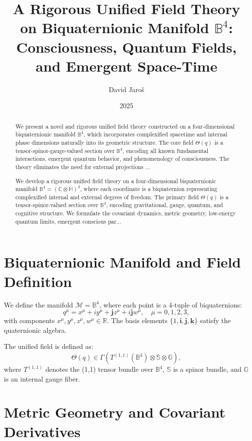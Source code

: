 \documentclass[12pt]{article}
\title{A Rigorous Unified Field Theory on Biquaternionic Manifold \( \mathbb{B}^4 \): Consciousness, Quantum Fields, and Emergent Space-Time}
\author{David Jaroš}
\date{2025}
\begin{document}
\maketitle

\begin{abstract}
We present a novel and rigorous unified field theory constructed on a four-dimensional biquaternionic manifold \( \mathbb{B}^4 \), which incorporates complexified spacetime and internal phase dimensions naturally into its geometric structure. The core field \( \Theta(q) \) is a tensor-spinor-gauge-valued section over \( \mathbb{B}^4 \), encoding all known fundamental interactions, emergent quantum behavior, and phenomenology of consciousness. The theory eliminates the need for external projections ...

We develop a rigorous unified field theory on a four-dimensional biquaternionic manifold \( \mathbb{B}^4 = (\mathbb{C} \otimes \mathbb{H})^4 \), where each coordinate is a biquaternion representing complexified internal and external degrees of freedom. The primary field \( \Theta(q) \) is a tensor-spinor-valued section over \( \mathbb{B}^4 \), encoding gravitational, gauge, quantum, and cognitive structure. We formulate the covariant dynamics, metric geometry, low-energy quantum limits, emergent conscious par...
\end{abstract}

\section{Biquaternionic Manifold and Field Definition}

We define the manifold \( \mathcal{M} = \mathbb{B}^4 \), where each point is a 4-tuple of biquaternions:
\[
q^\mu = x^\mu + i y^\mu + \mathbf{j} z^\mu + i \mathbf{j} w^\mu, \quad \mu = 0,1,2,3,
\]
with components \( x^\mu, y^\mu, z^\mu, w^\mu \in \mathbb{R} \). The basis elements \( \{1, \mathbf{i}, \mathbf{j}, \mathbf{k}\} \) satisfy the quaternionic algebra.

The unified field is defined as:
\[
\Theta(q) \in \Gamma \left( T^{(1,1)}(\mathbb{B}^4) \otimes \mathbb{S} \otimes \mathbb{G} \right),
\]
where \( T^{(1,1)} \) denotes the (1,1) tensor bundle over \( \mathbb{B}^4 \), \( \mathbb{S} \) is a spinor bundle, and \( \mathbb{G} \) is an internal gauge fiber.

\section{Metric Geometry and Covariant Derivatives}
\end{document}
